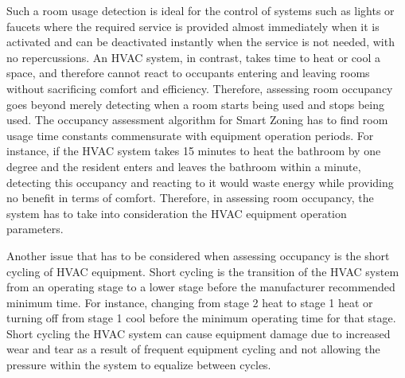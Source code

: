 
Such a room usage detection is ideal for the control of systems such as lights
or faucets where the required service is provided almost immediately when it is
activated and can be deactivated instantly when the service is not needed, with
no repercussions. An HVAC system, in contrast, takes time to heat or cool a
space, and therefore cannot react to occupants entering and leaving rooms
without sacrificing comfort and efficiency. Therefore, assessing room occupancy
goes beyond merely detecting when a room starts being used and stops being
used. The occupancy assessment algorithm for Smart Zoning has to find room usage
time constants commensurate with equipment operation periods. For instance, if
the HVAC system takes 15 minutes to heat the bathroom by one degree and the
resident enters and leaves the bathroom within a minute, detecting this
occupancy and reacting to it would waste energy while providing no benefit in
terms of comfort. Therefore, in assessing room occupancy, the system has to take
into consideration the HVAC equipment operation parameters.


Another issue that has to be considered when assessing occupancy is the short
cycling of HVAC equipment. Short cycling is the transition of the HVAC system
from an operating stage to a lower stage before the manufacturer recommended
minimum time. For instance, changing from stage 2 heat to stage 1 heat or
turning off from stage 1 cool before the minimum operating time for that
stage. Short cycling the HVAC system can cause equipment damage due to increased
wear and tear as a result of frequent equipment cycling and not allowing the
pressure within the system to equalize between cycles. 

